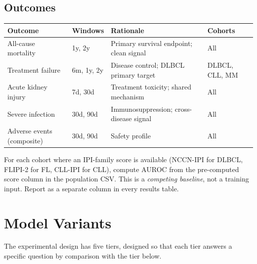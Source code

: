 \documentclass[11pt, a4paper]{article}
\begin{document}
\subsection{Outcomes}

\begin{center}
\begin{tabularx}{\textwidth}{llXl}
  \toprule
  \textbf{Outcome} & \textbf{Windows} & \textbf{Rationale} & \textbf{Cohorts} \\
  \midrule
  All-cause mortality       & 1y, 2y       & Primary survival endpoint; clean signal  & All \\
  Treatment failure         & 6m, 1y, 2y   & Disease control; DLBCL primary target   & DLBCL, CLL, MM \\
  Acute kidney injury       & 7d, 30d      & Treatment toxicity; shared mechanism    & All \\
  Severe infection          & 30d, 90d     & Immunosuppression; cross-disease signal & All \\
  Adverse events (composite)& 30d, 90d     & Safety profile                          & All \\
  \bottomrule
\end{tabularx}
\end{center}

\begin{tcolorbox}[notebox, title=Note on IPI baselines]
  For each cohort where an IPI-family score is available (NCCN-IPI for
  DLBCL, FLIPI-2 for FL, CLL-IPI for CLL), compute AUROC from the
  pre-computed score column in the population CSV.  This is a
  \emph{competing baseline}, not a training input.  Report as a
  separate column in every results table.
\end{tcolorbox}

\section{Model Variants}
\label{sec:variants}

The experimental design has five tiers, designed so that each tier
answers a specific question by comparison with the tier below.
\end{document}
